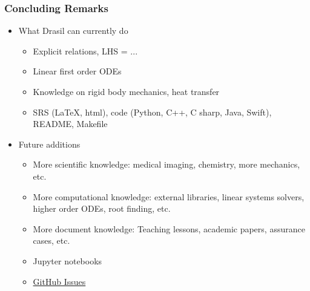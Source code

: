 \documentclass{beamer}
\begin{document}
\begin{frame}

\frametitle{Concluding Remarks}

\begin{itemize}
\item What Drasil can currently do
  \begin{itemize}
  \item Explicit relations, LHS = ...
  \item Linear first order ODEs
  \item Knowledge on rigid body mechanics, heat transfer
  \item SRS (LaTeX, html), code (Python, C++, C sharp, Java, Swift), README, Makefile
  \end{itemize}
\item Future additions
  \begin{itemize}
  \item More scientific knowledge: medical imaging, chemistry, more mechanics,
    etc.
  \item More computational knowledge: external libraries, linear systems
    solvers, higher order ODEs, root finding, etc.
  \item More document knowledge: Teaching lessons, academic papers, assurance
    cases, etc.
  \item Jupyter notebooks
  \item \href{https://github.com/JacquesCarette/Drasil/issues} {GitHub Issues}
  \end{itemize}

\end{itemize}

\end{frame}

\end{document}
